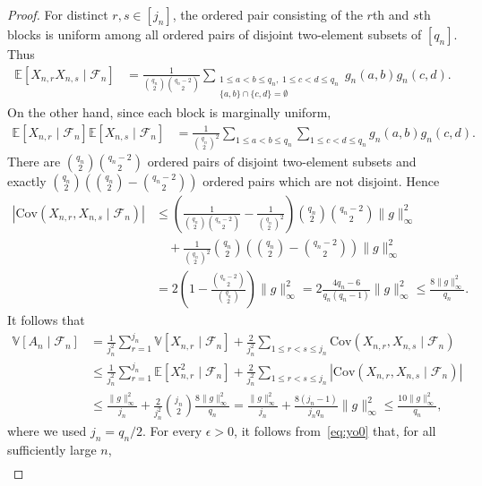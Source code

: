 \documentclass[10pt,a4paper]{amsart}
\newcommand{\Cov}{\mathrm{Cov}}
\newcommand{\Exb}[1]{\mathbb{E}\left[#1\right]}
\newcommand{\Vab}[1]{\mathbb{V}\left[#1\right]}
\newcommand{\cF}{\mathcal{F}}
\begin{document}
\begin{proof}
	For distinct $r,s\in[j_n]$, the ordered pair consisting of the $r$th and $s$th blocks is uniform among all ordered pairs of disjoint two-element subsets of $[q_n]$. Thus
		\begin{align*}
			\Exb{X_{n,r}X_{n,s}\mid\cF_n}
			&=
			\frac{1}{
				\binom{q_n}{2}\binom{q_n-2}{2}
			}
			\sum_{\substack{
					1\le a<b\le q_n,\;1\le c<d\le q_n\\
					\{a,b\}\cap\{c,d\}=\emptyset
			}}
			g_n(a,b)g_n(c,d).
		\end{align*}
		On the other hand, since each block is marginally uniform,
		\begin{align*}
			\Exb{X_{n,r}\mid\cF_n}\Exb{X_{n,s}\mid\cF_n} &= \frac{1}{\binom{q_n}{2}^2} \sum_{1\le a<b\le q_n} \sum_{1\le c<d\le q_n} g_n(a,b)g_n(c,d).
		\end{align*}
		There are
		$
			\binom{q_n}{2}\binom{q_n-2}{2}
		$
		ordered pairs of disjoint two-element subsets and exactly
		$
			\binom{q_n}{2} \left( \binom{q_n}{2}-\binom{q_n-2}{2}\right)
		$
		ordered pairs which are not disjoint. Hence
		\begin{align*}
			\left|\Cov(X_{n,r},X_{n,s}\mid\cF_n)\right| &\le \left( \frac{1}{ \binom{q_n}{2}\binom{q_n-2}{2}} - \frac{1}{\binom{q_n}{2}^2} \right) \binom{q_n}{2}\binom{q_n-2}{2} \|g\|_\infty^2\\
			&\quad+
			\frac{1}{\binom{q_n}{2}^2} \binom{q_n}{2} \left(\binom{q_n}{2}-\binom{q_n-2}{2}\right) \|g\|_\infty^2\\
			&= 2\left(1-\frac{\binom{q_n-2}{2}}{\binom{q_n}{2}}\right)\|g\|_\infty^2 =2\frac{4q_n-6}{q_n(q_n-1)}\|g\|_\infty^2 \le\frac{8\|g\|_\infty^2}{q_n}.
		\end{align*}
		It follows that
		\begin{align*}
			\Vab{A_n\mid\cF_n} &= \frac{1}{j_n^2} \sum_{r=1}^{j_n}\Vab{X_{n,r}\mid\cF_n} + \frac{2}{j_n^2} \sum_{1\le r<s\le j_n} \Cov(X_{n,r},X_{n,s}\mid\cF_n)\\
			&\le \frac{1}{j_n^2} \sum_{r=1}^{j_n}\Exb{X_{n,r}^2\mid\cF_n} + \frac{2}{j_n^2} \sum_{1\le r<s\le j_n} \left|\Cov(X_{n,r},X_{n,s}\mid\cF_n)\right|\\
			&\le \frac{\|g\|_\infty^2}{j_n} + \frac{2}{j_n^2}\binom{j_n}{2} \frac{8\|g\|_\infty^2}{q_n} = \frac{\|g\|_\infty^2}{j_n} + \frac{8(j_n-1)}{j_nq_n}\|g\|_\infty^2 \le \frac{10\|g\|_\infty^2}{q_n},
		\end{align*}
		where we used $j_n = q_n/2$. For every $\epsilon>0$, it follows from~\eqref{eq:yo0} that, for all sufficiently large $n$,
		\begin{align*}

\end{align*}
\end{proof}
\end{document}

